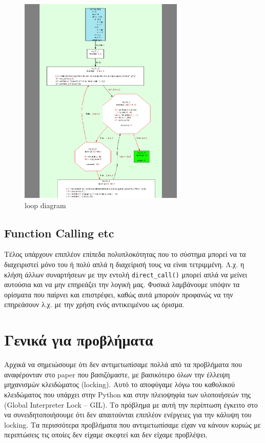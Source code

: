 \begin{figure}[h]
\centering
\includegraphics[width=0.7\textwidth]{loop-func.png}
\caption{loop diagram}
\label{figure-5}
\end{figure}

\subsection{Function Calling etc}

Τέλος υπάρχουν επιπλέον επίπεδα πολυπλοκότητας που το σύστημα μπορεί να τα
διαχειριστεί μόνο του ή πολύ απλά η διαχείρισή τους να είναι τετριμμένη. Λ.χ. η
κλήση άλλων συναρτήσεων με την εντολή \texttt{direct\_call()} μπορεί απλά να
μείνει αυτούσια και να μην επηρεάζει την λογική μας. Φυσικά λαμβάνουμε υπόψιν τα
ορίσματα που παίρνει και επιστρέφει, καθώς αυτά μπορούν προφανώς να την
επηρεάσουν λ.χ. με την χρήση ενός αντικειμένου ως όρισμα.


\section{Γενικά για προβλήματα}

Αρχικά να σημειώσουμε ότι δεν αντιμετωπίσαμε πολλά από τα προβλήματα που
αναφέρονταν στο paper\cite{stadler2014partial} που βασιζόμαστε, με βασικότερο
όλων την έλλειψη μηχανισμών κλειδώματος (locking). Αυτό το αποφύγαμε λόγω του
καθολικού κλειδώματος που υπάρχει στην Python και στην πλειοψηφία των
υλοποιήσεών της (Global Interpreter Lock – GIL). Το πρόβλημα με αυτή την
περίπτωση έγκειτο στο να συνειδητοποιήσουμε ότι δεν απαιτούνται επιπλέον
ενέργειες για την κάλυψη του locking.\cite{gil} Τα περισσότερα προβλήματα που
αντιμετωπίσαμε είχαν να κάνουν κυριώς με περιπτώσεις τις οποίες δεν είχαμε
σκεφτεί και δεν είχαμε προβλέψει.

